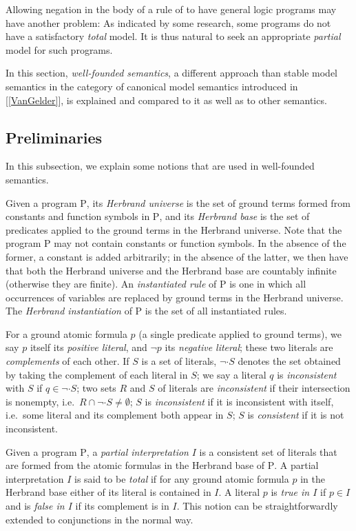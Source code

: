 Allowing negation in the body of a rule of to have general logic programs may have another problem: As indicated by some research, some programs do not have a satisfactory \emph{total} model. It is thus natural to seek an appropriate \emph{partial} model for such programs.

In this section, \emph{well-founded semantics}, a different approach than stable model semantics in the category of canonical model semantics introduced in [\ref{VanGelder}], is explained and compared to it as well as to other semantics.

\subsection{Preliminaries}
In this subsection, we explain some notions that are used in well-founded semantics.

Given a program $\mathrm{P}$, its \emph{Herbrand universe} is the set of ground terms formed from constants and function symbols in $\mathrm{P}$, and its \emph{Herbrand base} is the set of predicates applied to the ground terms in the Herbrand universe. Note that the program $\mathrm{P}$ may not contain constants or function symbols. In the absence of the former, a constant is added arbitrarily; in the absence of the latter, we then have that both the Herbrand universe and the Herbrand base are countably infinite (otherwise they are finite). An \emph{instantiated rule} of $\mathrm{P}$ is one in which all occurrences of variables are replaced by ground terms in the Herbrand universe. The \emph{Herbrand instantiation} of $\mathrm{P}$ is the set of all instantiated rules.

For a ground atomic formula $p$ (a single predicate applied to ground terms), we say $p$ itself its \emph{positive literal}, and $\neg p$ its \emph{negative literal}; these two literals are \emph{complements} of each other. If $S$ is a set of literals, $\neg \cdot S$ denotes the set obtained by taking the complement of each literal in $S$; we say a literal $q$ is \emph{inconsistent} with $S$ if $q \in \neg \cdot S$; two sets $R$ and $S$ of literals are \emph{inconsistent} if their intersection is nonempty, i.e.\ $R \cap \neg \cdot S \neq \emptyset$; $S$ is \emph{inconsistent} if it is inconsistent with itself, i.e.\ some literal and its complement both appear in $S$; $S$ is \emph{consistent} if it is not inconsistent.

Given a program $\mathrm{P}$, a \emph{partial interpretation} $I$ is a consistent set of literals that are formed from the atomic formulas in the Herbrand base of $\mathrm{P}$. A partial interpretation $I$ is said to be \emph{total} if for any ground atomic formula $p$ in the Herbrand base either of its literal is contained in $I$. A literal $p$ is \emph{true in $I$} if $p \in I$ and is \emph{false in $I$} if its complement is in $I$. This notion can be straightforwardly extended to conjunctions in the normal way.

